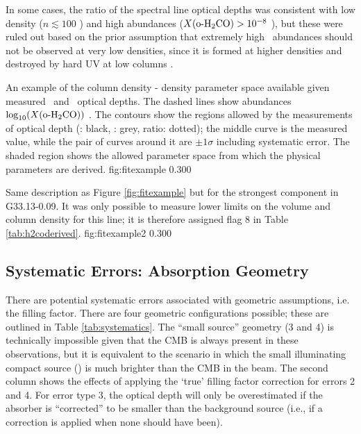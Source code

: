In some cases, the ratio of the spectral line optical depths was consistent with low
density ($n\lesssim 100$ \percc) and high abundances ($X(\textrm{o-H}_2\textrm{CO})>10^{-8}$ \perkmspc), but
these were ruled out based on the prior assumption that extremely high
\formaldehyde\ abundances should not be observed at very low densities, since
it is formed at higher densities and destroyed by hard UV at low columns
\citep[see discussion in][]{Troscompt2009b}.

{An example of the column density - density parameter space available given
measured \oneone\ and \twotwo\ optical depths.  The dashed lines show
abundances $\log_{10}(X(\textrm{o-H}_2\textrm{CO}))$ \perkmspc.  The contours show the
regions allowed by the measurements of optical depth (\oneone: black, \twotwo: grey,
ratio: dotted);
the middle curve is the measured value, while the pair of curves around it are
$\pm 1\sigma$ including systematic error.  The shaded region shows the allowed
parameter space from which the physical parameters are derived. }
{fig:fitexample}
{0.30}{0}

{  Same description as Figure
\ref{fig:fitexample} but for the strongest component in G33.13-0.09.  It was
only possible to measure lower limits on the volume and column density for this
line; it is therefore assigned flag 8 in Table \ref{tab:h2coderived}.
}
{fig:fitexample2}
{0.30}{0}


%

\subsection{Systematic Errors: Absorption Geometry}
There are potential systematic errors associated with geometric assumptions,
i.e. the filling factor.  There are four geometric configurations possible;
these are outlined in Table \ref{tab:systematics}.  The ``small source''
geometry (3 and 4) is technically impossible given that the CMB is always
present in these observations, but it is equivalent to the scenario in which
the small illuminating compact source (\uchii) is much brighter than the CMB in
the beam.  The second column shows the effects of applying the `true' filling
factor correction for errors 2 and 4.  For error type 3, the optical depth will
only be overestimated if the absorber is ``corrected'' to be smaller than the
background source (i.e., if a correction is applied when none should have
been).

